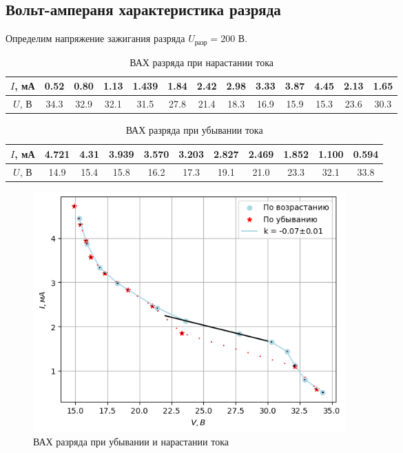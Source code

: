 \subsection*{Вольт-ампераня характеристика разряда}
Определим напряжение зажигания разряда $U_{\text{разр}} = 200$ В.
\begin{table}[h!]
    \centering
    \begin{tabular}{|c|c|c|c|c|c|c|c|c|c|c|c|c|}
        \hline
        $I$, мА & 0.52& 0.80& 1.13& 1.439& 1.84& 2.42& 2.98& 3.33& 3.87& 4.45& 2.13& 1.65 \\\hline
        $U$, В & 34.3& 32.9& 32.1& 31.5& 27.8& 21.4& 18.3& 16.9& 15.9& 15.3& 23.6& 30.3\\\hline
    \end{tabular}
    \caption{ВАХ разряда при нарастании тока}
\end{table}

\begin{table}[h!]
    \centering
    \begin{tabular}{|c|c|c|c|c|c|c|c|c|c|c|}
        \hline
        $I$, мА & 4.721& 4.31& 3.939& 3.570& 3.203& 2.827& 2.469& 1.852& 1.100& 0.594\\\hline
        $U$, В & 14.9& 15.4& 15.8& 16.2& 17.3& 19.1& 21.0& 23.3& 32.1& 33.8\\\hline
    \end{tabular}
    \caption{ВАХ разряда при убывании тока}
\end{table}
\begin{figure}[h!]
    \centering
    \includegraphics[width=12cm]{images/plot1.png}
    \caption{ВАХ разряда при убывании и нарастании тока}
\end{figure}

